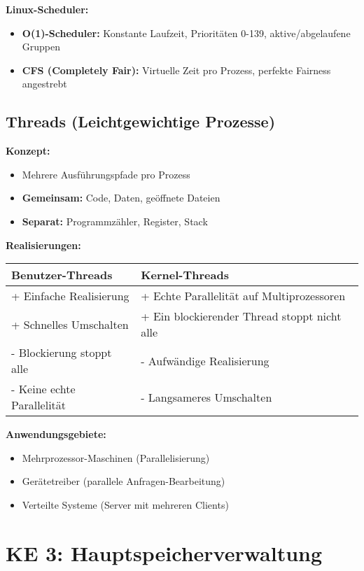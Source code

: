 \documentclass[9pt,a4paper]{extarticle}
\begin{document}
\begin{multicols*}{2}
\textbf{Linux-Scheduler:}
\begin{itemize}
\item \textbf{O(1)-Scheduler:} Konstante Laufzeit, Prioritäten 0-139, aktive/abgelaufene Gruppen
\item \textbf{CFS (Completely Fair):} Virtuelle Zeit pro Prozess, perfekte Fairness angestrebt
\end{itemize}

\subsection{Threads (Leichtgewichtige Prozesse)}
\textbf{Konzept:}
\begin{itemize}
\item Mehrere Ausführungspfade pro Prozess
\item \textbf{Gemeinsam:} Code, Daten, geöffnete Dateien
\item \textbf{Separat:} Programmzähler, Register, Stack
\end{itemize}

\textbf{Realisierungen:}
\begin{center}
\begin{tabular}{|p{3.5cm}|p{4.3cm}|}
\hline
\textbf{Benutzer-Threads} & \textbf{Kernel-Threads} \\
\hline
+ Einfache Realisierung & + Echte Parallelität auf Multiprozessoren \\
+ Schnelles Umschalten & + Ein blockierender Thread stoppt nicht alle \\
- Blockierung stoppt alle & - Aufwändige Realisierung \\
- Keine echte Parallelität & - Langsameres Umschalten \\
\hline
\end{tabular}
\end{center}

\textbf{Anwendungsgebiete:}
\begin{itemize}
\item Mehrprozessor-Maschinen (Parallelisierung)
\item Gerätetreiber (parallele Anfragen-Bearbeitung)
\item Verteilte Systeme (Server mit mehreren Clients)
\end{itemize}

\section{KE 3: Hauptspeicherverwaltung}


\end{multicols*}
\end{document}
